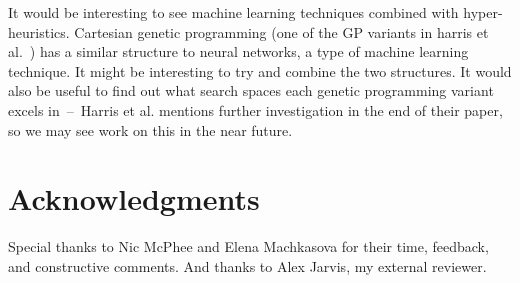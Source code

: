 \documentclass{sig-alternate}
\begin{document}
It would be interesting to see machine learning techniques combined with hyper-heuristics. Cartesian genetic programming (one of the GP variants in harris et al.~\cite{harris:2015}) has a similar structure to neural networks, a type of machine learning technique. It might be interesting to try and combine the two structures. It would also be useful to find out what search spaces each genetic programming variant excels in~--~Harris et al. mentions further investigation in the end of their paper, so we may see work on this in the near future.

\section*{Acknowledgments}
\label{sec:acknowledgments}
Special thanks to Nic McPhee and Elena Machkasova for their time, feedback, and constructive comments. And thanks to Alex Jarvis, my external reviewer.

  
\end{document}
